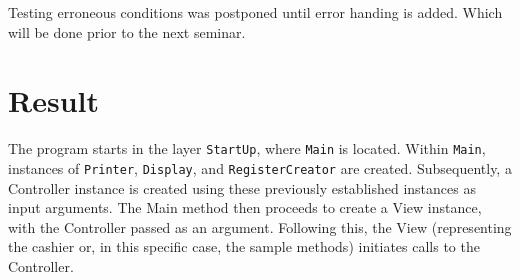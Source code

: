 \documentclass[a4paper]{scrreprt}
\newenvironment{longlisting}{\captionsetup{type=listing}}{}
\begin{document}
Testing erroneous conditions was postponed until error handing is added.
Which will be done prior to the next seminar.
%
%



%
%

\newpage
\chapter{Result}
\label{sec:result}
The program starts in the layer \verb|StartUp|,
where \verb|Main| is located.
Within \verb|Main|, instances of \verb|Printer|,
\verb|Display|, and \verb|RegisterCreator| are created.
Subsequently, a Controller instance is created using these previously established instances as input arguments.
The Main method then proceeds to create a View instance,
with the Controller passed as an argument.
Following this,
the View (representing the cashier or, in this specific case, the sample methods)
initiates calls to the Controller.
\end{document}
